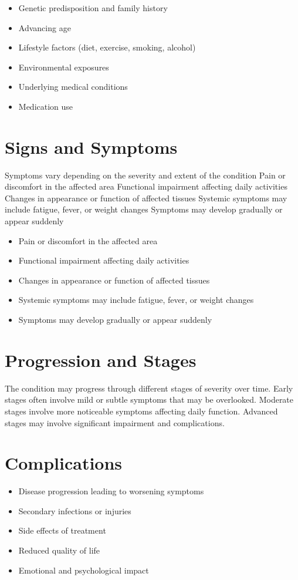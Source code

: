 \begin{itemize}[noitemsep]
  \item Genetic predisposition and family history
  \item Advancing age
  \item Lifestyle factors (diet, exercise, smoking, alcohol)
  \item Environmental exposures
  \item Underlying medical conditions
  \item Medication use
\end{itemize}
\section{Signs and Symptoms}
Symptoms vary depending on the severity and extent of the condition Pain or discomfort in the affected area Functional impairment affecting daily activities Changes in appearance or function of affected tissues Systemic symptoms may include fatigue, fever, or weight changes Symptoms may develop gradually or appear suddenly

\begin{itemize}[noitemsep]
  \item Pain or discomfort in the affected area
  \item Functional impairment affecting daily activities
  \item Changes in appearance or function of affected tissues
  \item Systemic symptoms may include fatigue, fever, or weight changes
  \item Symptoms may develop gradually or appear suddenly
\end{itemize}
\section{Progression and Stages}
The condition may progress through different stages of severity over time. Early stages often involve mild or subtle symptoms that may be overlooked. Moderate stages involve more noticeable symptoms affecting daily function. Advanced stages may involve significant impairment and complications.
\section{Complications}
\begin{itemize}[noitemsep]
  \item Disease progression leading to worsening symptoms
  \item Secondary infections or injuries
  \item Side effects of treatment
  \item Reduced quality of life
  \item Emotional and psychological impact
\end{itemize}
